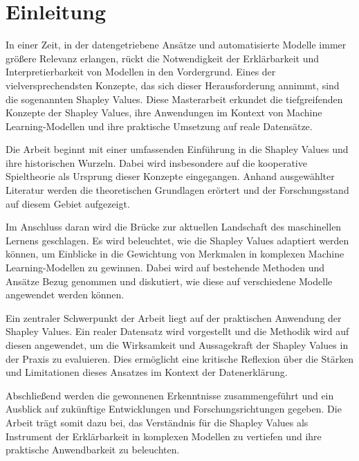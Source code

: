 \chapter{Einleitung}

In einer Zeit, in der datengetriebene Ansätze und automatisierte Modelle immer größere Relevanz erlangen, rückt die Notwendigkeit der Erklärbarkeit und Interpretierbarkeit von Modellen in den Vordergrund. Eines der vielversprechendsten Konzepte, das sich dieser Herausforderung annimmt, sind die sogenannten Shapley Values. Diese Masterarbeit erkundet die tiefgreifenden Konzepte der Shapley Values, ihre Anwendungen im Kontext von Machine Learning-Modellen und ihre praktische Umsetzung auf reale Datensätze.

Die Arbeit beginnt mit einer umfassenden Einführung in die Shapley Values und ihre historischen Wurzeln. Dabei wird insbesondere auf die kooperative Spieltheorie als Ursprung dieser Konzepte eingegangen. Anhand ausgewählter Literatur werden die theoretischen Grundlagen erörtert und der Forschungsstand auf diesem Gebiet aufgezeigt.

Im Anschluss daran wird die Brücke zur aktuellen Landschaft des maschinellen Lernens geschlagen. Es wird beleuchtet, wie die Shapley Values adaptiert werden können, um Einblicke in die Gewichtung von Merkmalen in komplexen Machine Learning-Modellen zu gewinnen. Dabei wird auf bestehende Methoden und Ansätze Bezug genommen und diskutiert, wie diese auf verschiedene Modelle angewendet werden können.

Ein zentraler Schwerpunkt der Arbeit liegt auf der praktischen Anwendung der Shapley Values. Ein realer Datensatz wird vorgestellt und die Methodik wird auf diesen angewendet, um die Wirksamkeit und Aussagekraft der Shapley Values in der Praxis zu evaluieren. Dies ermöglicht eine kritische Reflexion über die Stärken und Limitationen dieses Ansatzes im Kontext der Datenerklärung.

Abschließend werden die gewonnenen Erkenntnisse zusammengeführt und ein Ausblick auf zukünftige Entwicklungen und Forschungsrichtungen gegeben. Die Arbeit trägt somit dazu bei, das Verständnis für die Shapley Values als Instrument der Erklärbarkeit in komplexen Modellen zu vertiefen und ihre praktische Anwendbarkeit zu beleuchten.